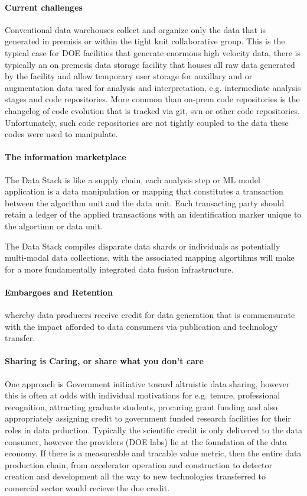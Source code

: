 \documentclass{article}
\begin{document}
\paragraph{Current challenges}
Conventional data warehouses collect and organize only the data that is generated in premisis or within the tight knit collaborative group.
This is the typical case for DOE facilities that generate enormous high velocity data, there is typically an on premesis data storage facility that houses all raw data generated by the facility and allow temporary user storage for auxillary and or augmentation data used for analysis and interpretation, e.g. intermediate analysis stages and code repositories.
More common than on-prem code repositories is the changelog of code evolution that is tracked via git, svn or other code repositories.
Unfortunately, such code repositories are not tightly coupled to the data these codes were used to manipulate.

\paragraph{The information marketplace}
The Data Stack is like a supply chain, each analysis step or ML model application is a data manipulation or mapping that constitutes a transaction between the algorithm unit and the data unit.
Each transacting party should retain a ledger of the applied transactions with an identification marker unique to the algortimn or data unit.


The Data Stack compiles disparate data shards or individuals as potentially multi-modal data collections, with the associated mapping algortihms will make for a more fundamentally integrated data fusion infrastructure.

\paragraph{Embargoes and Retention}
whereby data producers receive credit for data generation that is commensurate with the impact afforded to data consumers via publication and technology transfer.

\paragraph{Sharing is Caring, or share what you don't care}

One approach is Government initiative toward altruistic data sharing, however this is often at odds with individual motivations for e.g. tenure, professional recognition, attracting graduate students, procuring grant funding and also appropriately assigning credit to government funded research facilities for their roles in data prduction.  Typically the scientific credit is only delivered to the data consumer, however the providers (DOE labs) lie at the foundation of the data economy.
If there is a measureable and tracable value metric, then the entire data production chain, from accelerator operation and construction to detector creation and development all the way to new technologies transferred to comercial sector would recieve the due credit.
\end{document}
